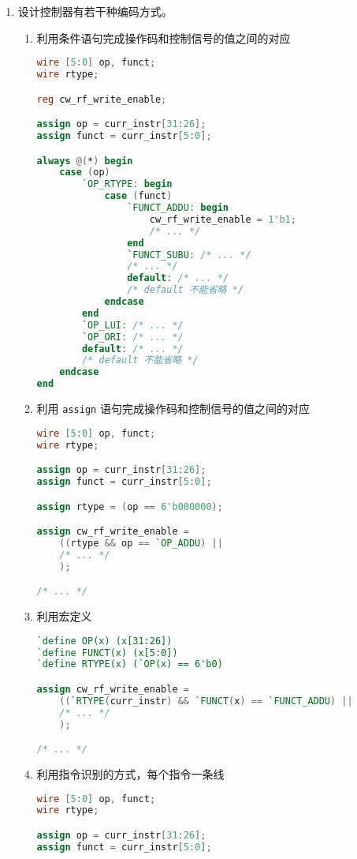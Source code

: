 \documentclass[12pt,AutoFakeBold]{article}
\begin{document}
\begin{enumerate}
\item 设计控制器有若干种编码方式。
\begin{enumerate}
\item 利用条件语句完成操作码和控制信号的值之间的对应
\begin{lstlisting}[language=Verilog]
wire [5:0] op, funct;
wire rtype;

reg cw_rf_write_enable;

assign op = curr_instr[31:26];
assign funct = curr_instr[5:0];

always @(*) begin
    case (op)
        `OP_RTYPE: begin
            case (funct)
                `FUNCT_ADDU: begin
                    cw_rf_write_enable = 1'b1;
                    /* ... */
                end
                `FUNCT_SUBU: /* ... */
                /* ... */
                default: /* ... */
                /* default 不能省略 */
            endcase
        end
        `OP_LUI: /* ... */
        `OP_ORI: /* ... */
        default: /* ... */
        /* default 不能省略 */
    endcase
end
\end{lstlisting}
\item 利用 \texttt{assign} 语句完成操作码和控制信号的值之间的对应
\begin{lstlisting}[language=Verilog]
wire [5:0] op, funct;
wire rtype;

assign op = curr_instr[31:26];
assign funct = curr_instr[5:0];

assign rtype = (op == 6'b000000);

assign cw_rf_write_enable =
    ((rtype && op == `OP_ADDU) || 
    /* ... */
    );

/* ... */
\end{lstlisting}
\item 利用宏定义
\begin{lstlisting}[language=Verilog]
`define OP(x) (x[31:26])
`define FUNCT(x) (x[5:0])
`define RTYPE(x) (`OP(x) == 6'b0)

assign cw_rf_write_enable = 
    ((`RTYPE(curr_instr) && `FUNCT(x) == `FUNCT_ADDU) ||
    /* ... */
    );

/* ... */
\end{lstlisting}
\item 利用指令识别的方式，每个指令一条线
\begin{lstlisting}[language=Verilog]
wire [5:0] op, funct;
wire rtype;

assign op = curr_instr[31:26];
assign funct = curr_instr[5:0];


\end{lstlisting}
\end{enumerate}
\end{enumerate}
\end{document}
